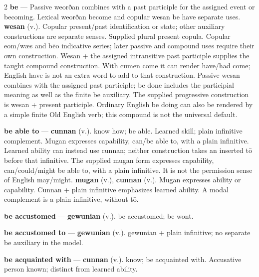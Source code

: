 \begin{multicols}{2}
\textbf{be} — Passive weorðan combines with a past participle for the assigned event or becoming. Lexical weorðan become and copular wesan be have separate uses. \textbf{wesan} (v.). Copular present/past identification or state; other auxiliary constructions are separate senses. Supplied plural present copula. Copular eom/wæs and bēo indicative series; later passive and compound uses require their own construction. Wesan + the assigned intransitive past participle supplies the taught compound construction. With cumen come it can render have/had come; English have is not an extra word to add to that construction. Passive wesan combines with the assigned past participle; be done includes the participial meaning as well as the finite be auxiliary. The supplied progressive construction is wesan + present participle. Ordinary English be doing can also be rendered by a simple finite Old English verb; this compound is not the universal default.\par
\textbf{be able to} — \textbf{cunnan} (v.). know how; be able. Learned skill; plain infinitive complement. Mugan expresses capability, can/be able to, with a plain infinitive. Learned ability can instead use cunnan; neither construction takes an inserted tō before that infinitive. The supplied mugan form expresses capability, can/could/might be able to, with a plain infinitive. It is not the permission sense of English may/might. \textbf{mugan} (v.), \textbf{cunnan} (v.). Mugan expresses ability or capability. Cunnan + plain infinitive emphasizes learned ability. A modal complement is a plain infinitive, without tō.\par
\textbf{be accustomed} — \textbf{gewunian} (v.). be accustomed; be wont.\par
\textbf{be accustomed to} — \textbf{gewunian} (v.). gewunian + plain infinitive; no separate be auxiliary in the model.\par
\textbf{be acquainted with} — \textbf{cunnan} (v.). know; be acquainted with. Accusative person known; distinct from learned ability.\par

\end{multicols}
